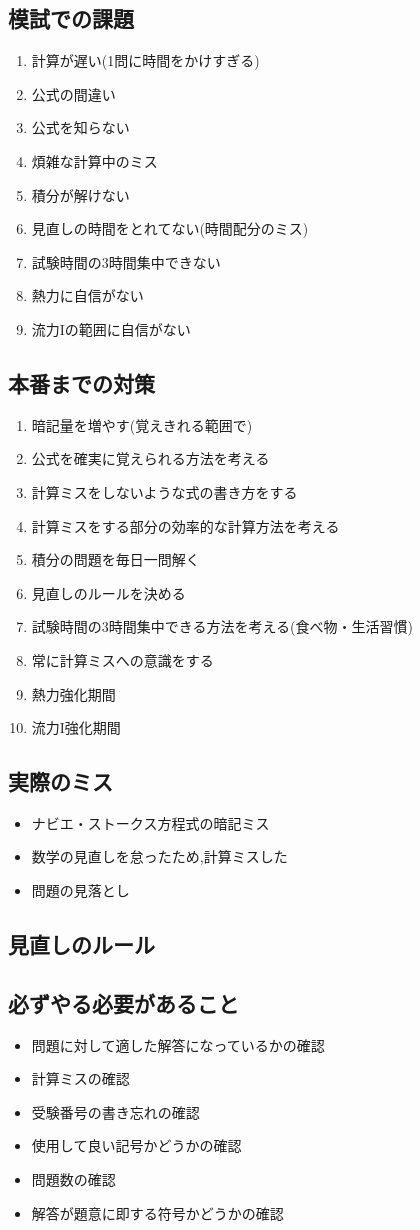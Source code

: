 \documentclass[a4paper]{jsarticle}
\begin{document}
\subsection{模試での課題}
\begin{enumerate}[(1)]
    \item 計算が遅い(1問に時間をかけすぎる)
    \item 公式の間違い
    \item 公式を知らない
    \item 煩雑な計算中のミス
    \item 積分が解けない
    \item 見直しの時間をとれてない(時間配分のミス)
    \item 試験時間の3時間集中できない
    \item 熱力に自信がない
    \item 流力Iの範囲に自信がない
\end{enumerate}
\subsection{本番までの対策}
\begin{enumerate}[(1)]
    \item 暗記量を増やす(覚えきれる範囲で)
    \item 公式を確実に覚えられる方法を考える
    \item 計算ミスをしないような式の書き方をする
    \item 計算ミスをする部分の効率的な計算方法を考える
    \item 積分の問題を毎日一問解く
    \item 見直しのルールを決める
    \item 試験時間の3時間集中できる方法を考える(食べ物・生活習慣)
    \item 常に計算ミスへの意識をする
    \item 熱力強化期間
    \item 流力I強化期間
\end{enumerate}
\subsection{実際のミス}
\begin{itemize}
    \item ナビエ・ストークス方程式の暗記ミス
    \item 数学の見直しを怠ったため,計算ミスした
    \item 問題の見落とし
\end{itemize}
\subsection{見直しのルール}
\subsection{必ずやる必要があること}
\begin{itemize}
    \item 問題に対して適した解答になっているかの確認
    \item 計算ミスの確認
    \item 受験番号の書き忘れの確認
    \item 使用して良い記号かどうかの確認
    \item 問題数の確認
    \item 解答が題意に即する符号かどうかの確認
\end{itemize}
\end{document}
